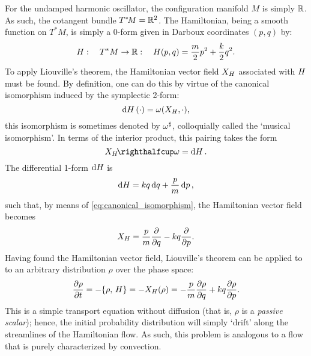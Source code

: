 For the undamped harmonic oscillator, the configuration manifold $M$ is simply $\mathbb{R}$. As such, the cotangent bundle $T^*\!M = \mathbb{R}^2$. The Hamiltonian, being a smooth function on $T^*M$, is simply a 0-form given in Darboux coordinates $(p, q)$ by:
\begin{equation}
    H:\quad T^*M \to \mathbb{R}:\quad H(p, q) = \frac{m}{2}p^2 + \frac{k}{2}q^2.
\end{equation}
To apply Liouville's theorem, the Hamiltonian vector field $X_{H}$ associated with $H$ must be found. By definition, one can do this by virtue of the canonical isomorphism induced by the symplectic 2-form:
$$ \dd{\ensuremath{H}}(\cdot) = \omega(X_{H}, \cdot), $$
this isomorphism is sometimes denoted by $\omega^\sharp$, colloquially called the `musical isomorphism'. In terms of the interior product, this pairing takes the form \cite{Abraham1978}
\begin{equation} 
    \intpr{X_H}{\omega} = \dd{H}.
    \label{eq:canonical_isomorphism}
\end{equation}
The differential 1-form $\dd{\ensuremath{H}}$ is
$$ \dd{\ensuremath{H}} = kq\dd{q} + \frac{p}{m}\dd{p}, $$ 
such that, by means of \cref{eq:canonical_isomorphism}, the Hamiltonian vector field becomes
$$ X_{H} =  \frac{p}{m}\pdv{}{q} - kq\pdv{}{p}. $$
Having found the Hamiltonian vector field, Liouville's theorem can be applied to to an arbitrary distribution $\rho$ over the phase space:
\begin{equation}
    \pdv{\rho}{t} = -\qty{\rho,\,H} = -X_H(\rho) = -\frac{p}{m}\pdv{\rho}{q} + kq\pdv{\rho}{p}.
    \label{eq:pde_ho}
\end{equation}
This is a simple transport equation without diffusion (that is, $\rho$ is a \emph{passive scalar}); hence, the initial probability distribution will simply `drift' along the streamlines of the Hamiltonian flow. As such, this problem is analogous to a flow that is purely characterized by convection. 


